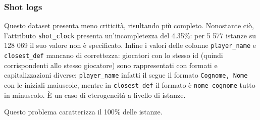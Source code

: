 \subsubsection{Shot logs}

Questo dataset presenta meno criticità, risultando più completo. Nonostante ciò, l'attributo \texttt{shot\_clock} presenta un'incompletezza del 4.35\%: per 5 577 istanze su 128 069 il suo valore non è specificato.
Infine i valori delle colonne \texttt{player\_name} e \texttt{closest\_def} mancano di correttezza: giocatori con lo stesso id (quindi corrispondenti allo stesso giocatore) sono rappresentati con formati e capitalizzazioni diverse: \texttt{player\_name} infatti il segue il formato \texttt{Cognome, Nome} con le iniziali maiuscole, mentre in \texttt{closest\_def} il formato è \texttt{nome cognome} tutto in minuscolo. È un caso di eterogeneità a livello di istanze.

\par
Questo problema caratterizza il 100\% delle istanze.
